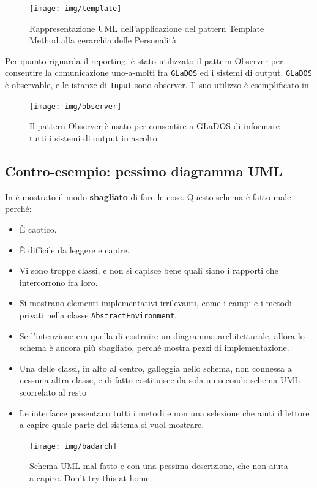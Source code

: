 \documentclass[a4paper,12pt]{report}
\begin{document}
\begin{figure}[H]
\centering{}
\texttt{[image: img/template]}
\caption{Rappresentazione UML dell'applicazione del pattern Template Method alla gerarchia delle Personalità}
\label{img:template}
\end{figure}

Per quanto riguarda il reporting, è stato utilizzato il pattern Observer per consentire la 
comunicazione uno-a-molti fra \texttt{GLaDOS} ed i sistemi di output.
%
\texttt{GLaDOS} è observable, e le istanze di \texttt{Input} sono observer.
%
Il suo utilizzo è esemplificato in 

\begin{figure}[H]
\centering{}
\texttt{[image: img/observer]}
\caption{Il pattern Observer è usato per consentire a GLaDOS di informare tutti i sistemi di output in ascolto}
\label{img:observer}
\end{figure}

\subsection*{Contro-esempio: pessimo diagramma UML}

In  è mostrato il modo \textbf{sbagliato} di fare le cose.
%
Questo schema è fatto male perché:
\begin{itemize}
	\item È caotico.
	\item È difficile da leggere e capire.
	\item Vi sono troppe classi, e non si capisce bene quali siano i rapporti che intercorrono fra loro.
	\item Si mostrano elementi implementativi irrilevanti, come i campi e i metodi privati nella classe \texttt{AbstractEnvironment}.
	\item Se l'intenzione era quella di costruire un diagramma architetturale, allora lo schema è ancora più sbagliato, perché mostra pezzi di implementazione.
	\item Una delle classi, in alto al centro, galleggia nello schema, non connessa a nessuna altra classe, e di fatto costituisce da sola un secondo schema UML scorrelato al resto
	\item Le interfacce presentano tutti i metodi e non una selezione che aiuti il lettore a capire quale parte del sistema si vuol mostrare.
\end{itemize}


\begin{figure}
\centering{}
\texttt{[image: img/badarch]}
\caption{Schema UML mal fatto e con una pessima descrizione, che non aiuta a capire. Don't try this at home.}
\label{img:badarch}
\end{figure}
\end{document}
